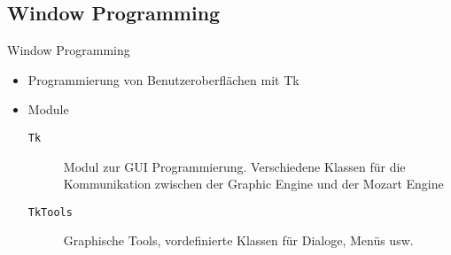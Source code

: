 \subsection{Window Programming}
\begin{frame}{Window Programming}
  \begin{itemize}
    \item Programmierung von Benutzeroberflächen mit Tk
    \item Module
    \begin{description}
      \item[\texttt{Tk}] Modul zur GUI Programmierung. Verschiedene Klassen für
      die Kommunikation zwischen der Graphic Engine und der Mozart Engine
      \item[\texttt{TkTools}] Graphische Tools, vordefinierte Klassen für
      Dialoge, Menüs usw. 
    \end{description}
  \end{itemize}
\end{frame}